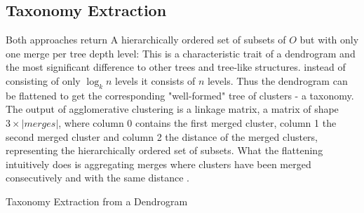 \subsection{Taxonomy Extraction}
Both approaches return A hierarchically ordered set of subsets of $O$ but with only one merge per tree depth level: This is a characteristic trait of a dendrogram and the most significant difference to other trees and tree-like structures. instead of consisting of only $\log_k n$ levels it consists of $n$ levels. Thus the dendrogram can be flattened to get the corresponding "well-formed" tree of clusters - a taxonomy. \\
The output of agglomerative clustering is a linkage matrix, a matrix of shape $3 \times |merges|$, where column 0 contains the first merged cluster, column 1 the second merged cluster and column 2 the distance of the merged clusters, representing the hierarchically ordered set of subsets.
What the flattening intuitively does is aggregating merges where clusters have been merged consecutively and with the same distance . 
\begin{algorithm}[h]
\caption{Taxonomy Extraction from a Dendrogram}\label{taxo}
\end{algorithm}

